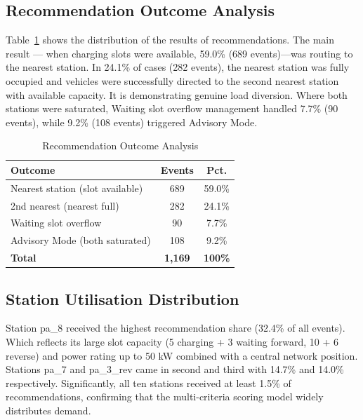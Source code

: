 \documentclass[conference]{IEEEtran}
\begin{document}
\subsection{Recommendation Outcome Analysis}

Table~\ref{tab:outcomes} shows the distribution of the results of
recommendations. The main result --- when charging slots were available,
59.0\% (689 events)---was routing to the nearest station. In 24.1\% of
cases (282 events), the nearest station was fully occupied and vehicles
were successfully directed to the second nearest station with available
capacity. It is demonstrating genuine load diversion. Where both
stations were saturated, Waiting slot overflow management handled 7.7\%
(90 events), while 9.2\% (108 events) triggered Advisory Mode.

\begin{table}[htbp]
\caption{Recommendation Outcome Analysis}
\label{tab:outcomes}
\begin{center}
\begin{tabular}{|l|c|c|}
\hline
\textbf{Outcome} & \textbf{Events} & \textbf{Pct.} \\
\hline
Nearest station (slot available)  & 689 & 59.0\% \\
\hline
2nd nearest (nearest full)        & 282 & 24.1\% \\
\hline
Waiting slot overflow             & 90  &  7.7\% \\
\hline
Advisory Mode (both saturated)    & 108 &  9.2\% \\
\hline
\textbf{Total}                    & \textbf{1,169} & \textbf{100\%} \\
\hline
\end{tabular}
\end{center}
\end{table}

\subsection{Station Utilisation Distribution}

Station pa\_8 received the highest recommendation share (32.4\% of all
events). Which reflects its large slot capacity (5 charging + 3 waiting
forward, 10 + 6 reverse) and power rating up to 50 kW combined with a
central network position. Stations pa\_7 and pa\_3\_rev came in second
and third with 14.7\% and 14.0\% respectively. Significantly, all ten
stations received at least 1.5\% of recommendations, confirming that
the multi-criteria scoring model \cite{b7, b12} widely distributes demand.
\end{document}
